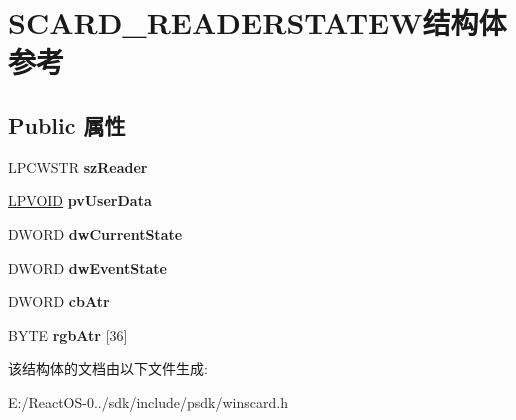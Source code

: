 \hypertarget{struct_s_c_a_r_d___r_e_a_d_e_r_s_t_a_t_e_w}{}\section{S\+C\+A\+R\+D\+\_\+\+R\+E\+A\+D\+E\+R\+S\+T\+A\+T\+E\+W结构体 参考}
\label{struct_s_c_a_r_d___r_e_a_d_e_r_s_t_a_t_e_w}
\subsection*{Public 属性}
\begin{DoxyCompactItemize}
\item 
\mbox{\label{struct_s_c_a_r_d___r_e_a_d_e_r_s_t_a_t_e_w_a7f8f6bfa7b92735969f47c0a29b7f7b0}} 
L\+P\+C\+W\+S\+TR {\bfseries sz\+Reader}
\item 
\mbox{\label{struct_s_c_a_r_d___r_e_a_d_e_r_s_t_a_t_e_w_af963f82714ba3fe01b4b6518b8696fab}} 
\hyperlink{interfacevoid}{L\+P\+V\+O\+ID} {\bfseries pv\+User\+Data}
\item 
\mbox{\label{struct_s_c_a_r_d___r_e_a_d_e_r_s_t_a_t_e_w_abb8132809e9cc3eefc532b242c5d622d}} 
D\+W\+O\+RD {\bfseries dw\+Current\+State}
\item 
\mbox{\label{struct_s_c_a_r_d___r_e_a_d_e_r_s_t_a_t_e_w_a12e1cc7fdb4e5c0f408528e6215e33e6}} 
D\+W\+O\+RD {\bfseries dw\+Event\+State}
\item 
\mbox{\label{struct_s_c_a_r_d___r_e_a_d_e_r_s_t_a_t_e_w_a876b308e4368ef3b4309c66d7ff9d8ed}} 
D\+W\+O\+RD {\bfseries cb\+Atr}
\item 
\mbox{\label{struct_s_c_a_r_d___r_e_a_d_e_r_s_t_a_t_e_w_a355395c889cbc37db3ed886885995977}} 
B\+Y\+TE {\bfseries rgb\+Atr} \mbox{[}36\mbox{]}
\end{DoxyCompactItemize}


该结构体的文档由以下文件生成\+:\begin{DoxyCompactItemize}
\item 
E\+:/\+React\+O\+S-\/0../sdk/include/psdk/winscard.\+h\end{DoxyCompactItemize}
